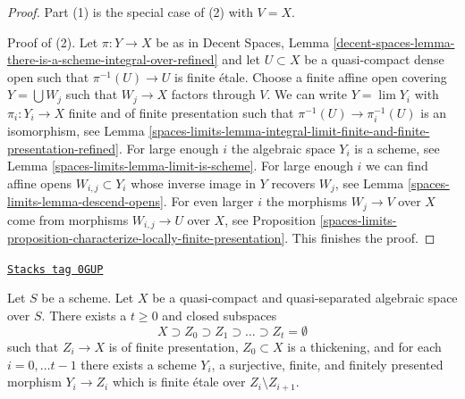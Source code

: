 \begin{proof}
Part (1) is the special case of (2) with $V = X$.

\medskip\noindent
Proof of (2). Let $\pi : Y \to X$ be as in Decent Spaces, Lemma
\ref{decent-spaces-lemma-there-is-a-scheme-integral-over-refined}
and let $U \subset X$ be a quasi-compact dense open such that
$\pi^{-1}(U) \to U$ is finite \'etale.
Choose a finite affine open covering $Y = \bigcup W_j$ such that
$W_j \to X$ factors through $V$. We can write $Y = \lim Y_i$ with
$\pi_i : Y_i \to X$ finite and of finite presentation such
that $\pi^{-1}(U) \to \pi_i^{-1}(U)$ is an isomorphism, see
Lemma \ref{spaces-limits-lemma-integral-limit-finite-and-finite-presentation-refined}.
For large enough $i$ the algebraic space $Y_i$ is a scheme, see
Lemma \ref{spaces-limits-lemma-limit-is-scheme}.
For large enough $i$ we can find affine opens $W_{i, j} \subset Y_i$
whose inverse image in $Y$ recovers $W_j$, see
Lemma \ref{spaces-limits-lemma-descend-opens}.
For even larger $i$ the morphisms $W_j \to V$ over $X$ come
from morphisms $W_{i, j} \to U$ over $X$, see Proposition
\ref{spaces-limits-proposition-characterize-locally-finite-presentation}.
This finishes the proof.
\end{proof}

\begin{lemma}
\label{spaces-limits-lemma-there-is-a-scheme-finite-over-filtered}
\href{https://stacks.math.columbia.edu/tag/0GUP}{\texttt{Stacks tag 0GUP}}

Let $S$ be a scheme. Let $X$ be a quasi-compact and quasi-separated
algebraic space over $S$. There exists a $t \geq 0$ and closed
subspaces
$$
X \supset Z_0 \supset Z_1 \supset \ldots \supset Z_t = \emptyset
$$
such that $Z_i \to X$ is of finite presentation,
$Z_0 \subset X$ is a thickening, and for each $i = 0, \ldots t - 1$
there exists a scheme $Y_i$, a surjective, finite, and finitely
presented morphism $Y_i \to Z_i$ which is finite \'etale over
$Z_i \setminus Z_{i + 1}$.
\end{lemma}

